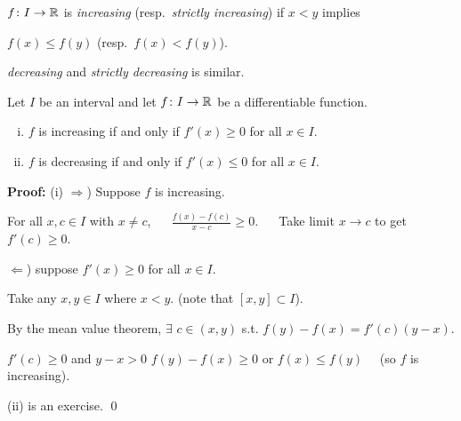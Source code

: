 \documentclass[10pt,aspectratio=169]{beamer}
\begin{document}
\begin{frame}
$f \colon I \to {\mathbb{R}}$ is \emph{increasing}
(resp.\  \emph{strictly increasing}) if
$x < y$ implies

$f(x) \leq f(y)$ (resp.\ $f(x) < f(y)$).

\pause
\emph{decreasing} and
\emph{strictly decreasing} is similar.

\pause
\begin{proposition}
Let $I$ be an interval and
let $f \colon I \to {\mathbb{R}}$ be a differentiable function.
\begin{enumerate}[(i)]
\item
\pause
$f$ is increasing if and only if $f'(x) \geq 0$ for all $x \in I$.
\item
\pause
$f$ is decreasing if and only if $f'(x) \leq 0$ for all $x \in I$.
\end{enumerate}
\end{proposition}

\pause
\textbf{Proof:}
(i) $\Rightarrow$) Suppose $f$ is increasing.

\pause
\medskip

For all $x,c \in I$ with $x \neq c$, ~~
$\displaystyle
\frac{f(x)-f(c)}{x-c} \geq 0$.
\pause
~~
Take limit $x \to c$ to get $f'(c) \geq 0$.

\pause
\medskip

$\Leftarrow$) suppose $f'(x) \geq 0$ for all $x \in I$.

\pause
Take any $x, y \in I$ where $x < y$.  (note that $[x,y] \subset I$).

\pause
\medskip

By the mean value theorem, $\exists$ $c \in (x,y)$ s.t.
$\displaystyle
f(y)-f(x) = f'(c)(y-x)$.

\pause
\medskip

$f'(c) \geq 0$ and $y-x > 0$ \wthus $f(y) - f(x) \geq 0$ or $f(x) \leq
f(y)$
\pause
~~(so $f$ is increasing).

\pause
\medskip

(ii) is an exercise.
\qed

\end{frame}
\end{document}
